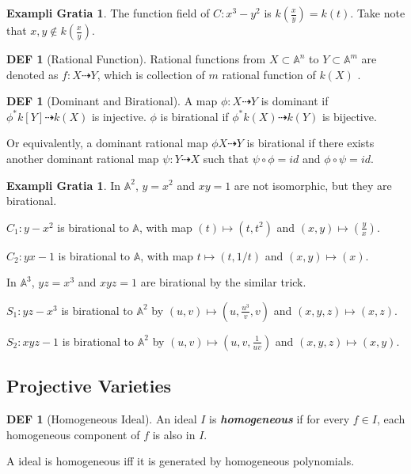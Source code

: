 \documentclass[twocolumn]{article}
\renewcommand{\emph}[1]{\textbf{\textit{#1}}}
\newcommand{\A}{\mathbb{A}}
\theoremstyle{definition}
\newtheorem{example}[thm]{Exampli Gratia}
\newtheorem{defi}[thm]{DEF}
\theoremstyle{remark}
\begin{document}
\begin{example}
	The function field of $C: x^3 - y^2$ is $k(\frac{x}{y}) = k(t)$. Take note that $x, y \notin k(\frac{x}{y})$.
\end{example}

\begin{defi}[Rational Function]
	Rational functions from $X \subset \A^n$ to $Y \subset \A^m$ are denoted as $f: X \dasharrow Y$, which is collection of $m$ rational function of $k(X)$ .
\end{defi}

\begin{defi}[Dominant and Birational]
	A map $\phi: X \dasharrow Y$ is dominant if $\phi^* k[Y] \dasharrow k(X)$ is injective.
	$\phi$ is birational if $\phi^* k(X) \dasharrow k(Y)$ is bijective.

	Or equivalently, a dominant rational map $\phi X \dasharrow Y$ is birational if there exists another dominant rational map $\psi: Y \dasharrow X$ such that $\psi \circ \phi = id$ and $\phi \circ \psi = id$.
\end{defi}

\begin{example}
	In $\A^2$, $y = x^2 $ and $xy = 1$ are not isomorphic, but they are birational.

	$C_1: y -x^2$ is birational to $\A$,
	with map $(t) \mapsto (t, t^2)$ and $(x, y) \mapsto (\frac{y}{x})$.

	$C_2: yx  - 1$ is birational to $\A$,
	with map $t \mapsto (t, 1/t)$ and $(x, y) \mapsto (x)$.

	In $\A^3$, $yz = x^3$ and $xyz = 1$ are birational by the similar trick.

	$S_1: yz - x^3$ is birational to $\A^2$ by $(u, v) \mapsto (u, \frac{u^3}{v}, v)$ and $(x,y,z) \mapsto (x, z)$.

	$S_2: xyz - 1$ is birational to $\A^2$ by $(u, v) \mapsto (u, v, \frac{1}{uv})$ and $(x,y,z) \mapsto (x, y)$.
\end{example}

\subsection{Projective Varieties}

\begin{defi}[Homogeneous Ideal]
	An ideal $I$ is \emph{homogeneous} if for every $f \in I$, each homogeneous component of $f$ is also in $I$.

	A ideal is homogeneous iff it is generated by homogeneous polynomials.
\end{defi}
\end{document}
